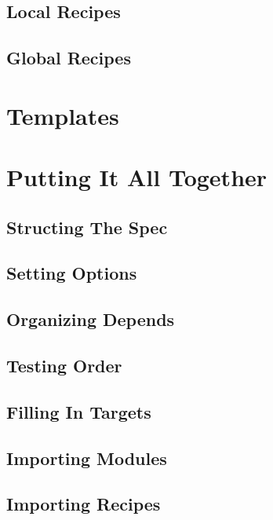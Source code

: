 \subsection{Local Recipes}


\subsection{Global Recipes}



\section{Templates}



\section{Putting It All Together}


\subsection{Structing The Spec}


\subsection{Setting Options}


\subsection{Organizing Depends}


\subsection{Testing Order}


\subsection{Filling In Targets}


\subsection{Importing Modules}


\subsection{Importing Recipes}


